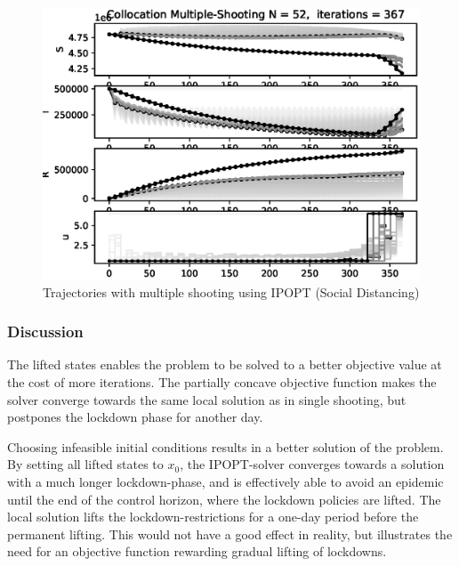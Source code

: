 \begin{figure}[H]
    \centering
    \includegraphics[width=.8\textwidth]{pythonProject/Figures/Collocation_Trajectory_Social_Distancing.eps}
    \caption{Trajectories with multiple shooting using IPOPT (Social Distancing)}
    \label{fig:MS_Traj_SD_IPOPT}
\end{figure}

\subsubsection{Discussion}
The lifted states enables the problem to be solved to a better objective value at the cost of more iterations. The partially concave objective function makes the solver converge towards the same local solution as in single shooting, but postpones the lockdown phase for another day.

Choosing infeasible initial conditions results in a better solution of the problem. By setting all lifted states to $x_0$, the IPOPT-solver converges towards a solution with a much longer lockdown-phase, and is effectively able to avoid an epidemic until the end of the control horizon, where the lockdown policies are lifted. The local solution lifts the lockdown-restrictions for a one-day period before the permanent lifting. This would not have a good effect in reality, but illustrates the need for an objective function rewarding gradual lifting of lockdowns. 


